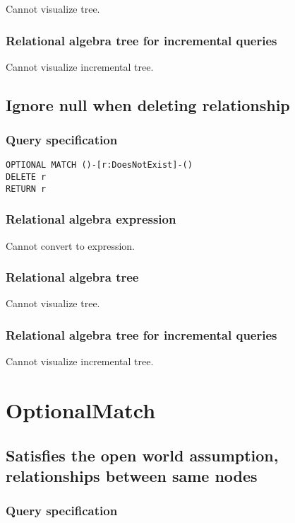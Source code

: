 Cannot visualize tree.

\subsubsection*{Relational algebra tree for incremental queries}

Cannot visualize incremental tree.

\subsection{Ignore null when deleting relationship}

\subsubsection*{Query specification}

\begin{lstlisting}
OPTIONAL MATCH ()-[r:DoesNotExist]-()
DELETE r
RETURN r
\end{lstlisting}

\subsubsection*{Relational algebra expression}

Cannot convert to expression.

\subsubsection*{Relational algebra tree}

Cannot visualize tree.

\subsubsection*{Relational algebra tree for incremental queries}

Cannot visualize incremental tree.

\section{OptionalMatch}

\subsection{Satisfies the open world assumption, relationships between same nodes}

\subsubsection*{Query specification}

